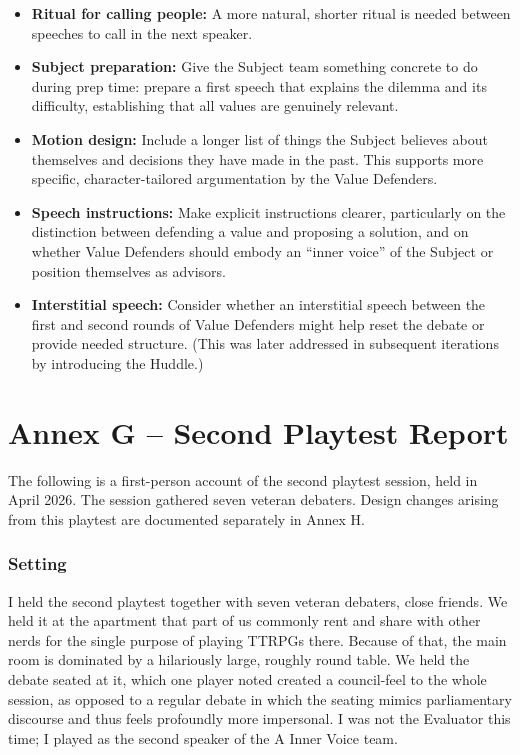 \begin{itemize}
    \item \textbf{Ritual for calling people:} A more natural, shorter ritual is needed between speeches to call in the next speaker.
    \item \textbf{Subject preparation:} Give the Subject team something concrete to do during prep time: prepare a first speech that explains the dilemma and its difficulty, establishing that all values are genuinely relevant.
    \item \textbf{Motion design:} Include a longer list of things the Subject believes about themselves and decisions they have made in the past. This supports more specific, character-tailored argumentation by the Value Defenders.
    \item \textbf{Speech instructions:} Make explicit instructions clearer, particularly on the distinction between defending a value and proposing a solution, and on whether Value Defenders should embody an ``inner voice'' of the Subject or position themselves as advisors.
    \item \textbf{Interstitial speech:} Consider whether an interstitial speech between the first and second rounds of Value Defenders might help reset the debate or provide needed structure. (This was later addressed in subsequent iterations by introducing the Huddle.)
\end{itemize}


\newpage
\section*{Annex G -- Second Playtest Report}

The following is a first-person account of the second playtest session, held in April 2026. The session gathered seven veteran debaters. Design changes arising from this playtest are documented separately in Annex H.

\subsubsection{Setting}

I held the second playtest together with seven veteran debaters, close friends. We held it at the apartment that part of us commonly rent and share with other nerds for the single purpose of playing TTRPGs there. Because of that, the main room is dominated by a hilariously large, roughly round table. We held the debate seated at it, which one player noted created a council-feel to the whole session, as opposed to a regular debate in which the seating mimics parliamentary discourse and thus feels profoundly more impersonal. I was not the Evaluator this time; I played as the second speaker of the A Inner Voice team.

